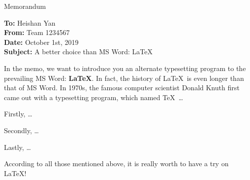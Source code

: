 \documentclass[12pt]{article}
\begin{document}
\begin{letter}{Memorandum}

	\begin{flushleft}  %
		\textbf{To:} Heishan Yan\\
		\textbf{From:} Team 1234567\\
		\textbf{Date:} October 1st, 2019\\
		\textbf{Subject:} A better choice than MS Word: \LaTeX
	\end{flushleft}
	
	In the memo, we want to introduce you an alternate typesetting program to the prevailing MS Word: \textbf{\LaTeX}. In fact, the history of \LaTeX\ is even longer than that of MS Word. In 1970s, the famous computer scientist Donald Knuth first came out with a typesetting program, which named \TeX\ \ldots
	
	Firstly, \ldots
	
	Secondly, \ldots
	
	Lastly, \ldots
	
	According to all those mentioned above, it is really worth to have a try on \LaTeX!
	
\end{letter}





\newrefcontext[sorting=nyt]
\printbibliography
\end{document}
